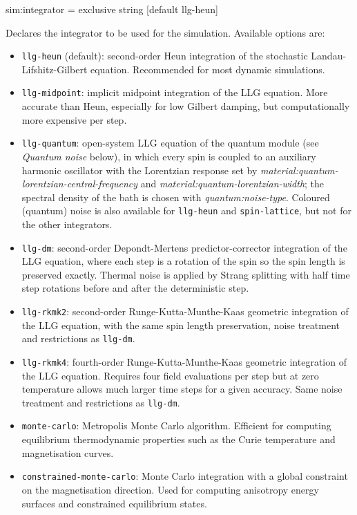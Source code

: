 {\zicf sim:integrator = exclusive string [default llg-heun]} Declares the integrator to be used for the simulation. Available options are:
\begin{itemize}
  \item[] \texttt{llg-heun} (default): second-order Heun integration of the stochastic Landau-Lifshitz-Gilbert equation. Recommended for most dynamic simulations.
  \item[] \texttt{llg-midpoint}: implicit midpoint integration of the LLG equation. More accurate than Heun, especially for low Gilbert damping, but computationally more expensive per step.
  \item[] \texttt{llg-quantum}: open-system LLG equation of the quantum module (see \textit{Quantum noise} below), in which every spin is coupled to an auxiliary harmonic oscillator with the Lorentzian response set by \textit{material:quantum-lorentzian-central-frequency} and \textit{material:quantum-lorentzian-width}; the spectral density of the bath is chosen with \textit{quantum:noise-type}. Coloured (quantum) noise is also available for \texttt{llg-heun} and \texttt{spin-lattice}, but not for the other integrators.
  \item[] \texttt{llg-dm}: second-order Depondt-Mertens predictor-corrector integration of the LLG equation, where each step is a rotation of the spin so the spin length is preserved exactly. Thermal noise is applied by Strang splitting with half time step rotations before and after the deterministic step.
  \item[] \texttt{llg-rkmk2}: second-order Runge-Kutta-Munthe-Kaas geometric integration of the LLG equation, with the same spin length preservation, noise treatment and restrictions as \texttt{llg-dm}.
  \item[] \texttt{llg-rkmk4}: fourth-order Runge-Kutta-Munthe-Kaas geometric integration of the LLG equation. Requires four field evaluations per step but at zero temperature allows much larger time steps for a given accuracy. Same noise treatment and restrictions as \texttt{llg-dm}.
  \item[] \texttt{monte-carlo}: Metropolis Monte Carlo algorithm. Efficient for computing equilibrium thermodynamic properties such as the Curie temperature and magnetisation curves.
  \item[] \texttt{constrained-monte-carlo}: Monte Carlo integration with a global constraint on the magnetisation direction. Used for computing anisotropy energy surfaces and constrained equilibrium states.

\end{itemize}
